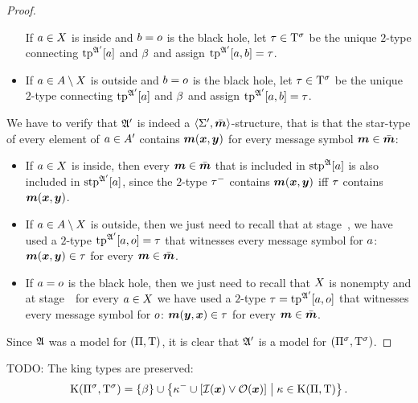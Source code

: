 \begin{proof}
\begin{itemize}
  If $a \in X$ is inside and $b = o$ is the black hole, let $\tau
  \in \mathrm{T}^{\sigma}$ be the unique $2$-type connecting $\operatorname{tp}^{\mathfrak{A'}}[a]$ and
  $\beta$ and assign $\operatorname{tp}^{\mathfrak{A'}}[a,b] = \tau$.
  \item[\refsticondOB]
  If $a \in A\setminus X$ is outside and $b = o$ is the black hole, let
  $\tau \in \mathrm{T}^{\sigma}$ be the unique $2$-type connecting $\operatorname{tp}^{\mathfrak{A'}}[a]$ and
  $\beta$ and assign $\operatorname{tp}^{\mathfrak{A'}}[a,b] = \tau$.
\end{itemize}
We have to verify that $\mathfrak{A'}$ is indeed a $\left\langle \mathrm{\Sigma'},\bar{\bm{m}} \right\rangle$-structure, that
is that the star-type of every element of $a \in A'$ contains
$\bm{m}(\bm{x},\bm{y})$ for every message symbol $\bm{m} \in \bar{\bm{m}}$:
\begin{itemize}
\item[\refsticondI] If $a \in X$ is inside, then every
$\bm{m} \in \bar{\bm{m}}$ that is included in $\operatorname{stp}^{\mathfrak{A}}[a]$ is also included in
$\operatorname{stp}^{\mathfrak{A'}}[a]$, since the $2$-type $\tau^{-}$ contains $\bm{m}(\bm{x},\bm{y})$ iff
$\tau$ contains $\bm{m}(\bm{x},\bm{y})$.
\item[\refsticondO] If $a \in A\setminus X$ is outside, then we just need to
recall that at stage~, we have used a $2$-type $\operatorname{tp}^{\mathfrak{A'}}[a,o]
= \tau$ that witnesses every message symbol for $a$: $\bm{m}(\bm{x},\bm{y}) \in
\tau$ for every $\bm{m} \in \bar{\bm{m}}$.
\item[\refsticondB] If $a = o$ is the black hole, then we just need to
recall that $X$ is nonempty and at stage~~for every $a \in
X$ we have used a $2$-type $\tau = \operatorname{tp}^{\mathfrak{A'}}[a,o]$ that witnesses every
message symbol for $o$: $\bm{m}(\bm{y},\bm{x}) \in \tau$ for every $\bm{m} \in \bar{\bm{m}}$.
\end{itemize}
Since $\mathfrak{A}$ was a model for $(\Pi,\mathrm{T})$, it is clear that $\mathfrak{A'}$ is a
model for $(\Pi^{\sigma},\mathrm{T}^{\sigma})$.
\end{proof}

\begin{remark}%
TODO: The king types are preserved:
\[
  \mathrm{K}(\Pi^{\sigma},\mathrm{T}^{\sigma}) = \left\{\beta\right\} \cup
  \left\{\kappa^{-}\cup[\mathcal{I}(\bm{x})\lor\mathcal{O}(\bm{x})]\mathrel{}\middle|\mathrel{}\kappa\in\mathrm{K}(\Pi,\mathrm{T})\right\}.
\]
\end{remark}

